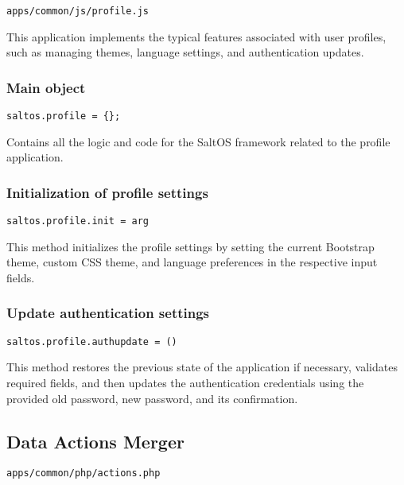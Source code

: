 \documentclass[a4paper]{article}
\begin{document}
\begin{lstlisting}
apps/common/js/profile.js
\end{lstlisting}

This application implements the typical features associated with user profiles,
such as managing themes, language settings, and authentication updates.

\hypertarget{toc22}{}
\subsubsection{Main object}

\begin{lstlisting}
saltos.profile = {};
\end{lstlisting}

Contains all the logic and code for the SaltOS framework related to the profile application.

\hypertarget{toc23}{}
\subsubsection{Initialization of profile settings}

\begin{lstlisting}
saltos.profile.init = arg
\end{lstlisting}

This method initializes the profile settings by setting the current Bootstrap theme,
custom CSS theme, and language preferences in the respective input fields.

\hypertarget{toc24}{}
\subsubsection{Update authentication settings}

\begin{lstlisting}
saltos.profile.authupdate = ()
\end{lstlisting}

This method restores the previous state of the application if necessary,
validates required fields, and then updates the authentication credentials
using the provided old password, new password, and its confirmation.

\hypertarget{toc25}{}
\subsection{Data Actions Merger}

\begin{lstlisting}
apps/common/php/actions.php
\end{lstlisting}
\end{document}
